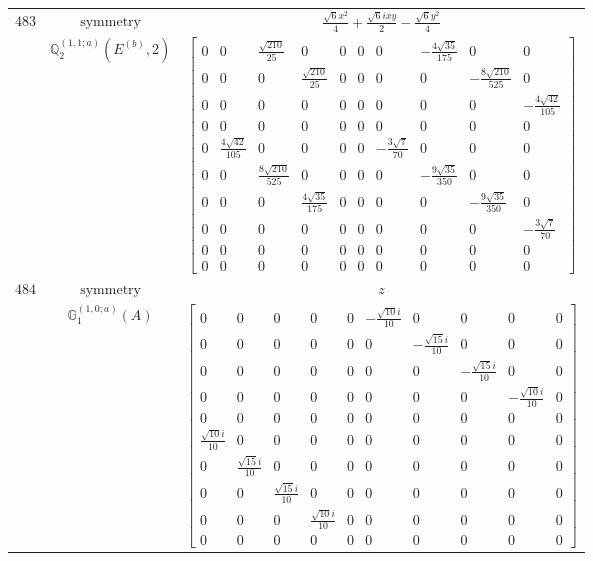 \documentclass[fleqn,8pt,landscape]{jsarticle}
\begin{document}
\begin{longtable}{ccc}
$ 483 $ & $ \text{symmetry} $ & $ \frac{\sqrt{6} x^{2}}{4} + \frac{\sqrt{6} i x y}{2} - \frac{\sqrt{6} y^{2}}{4} $ \\
$  $ & $ \mathbb{Q}_{2}^{(1,1;a)}(E^{(b)},2) $ & $ \begin{bmatrix} 0 & 0 & \frac{\sqrt{210}}{25} & 0 & 0 & 0 & 0 & - \frac{4 \sqrt{35}}{175} & 0 & 0 \\ 0 & 0 & 0 & \frac{\sqrt{210}}{25} & 0 & 0 & 0 & 0 & - \frac{8 \sqrt{210}}{525} & 0 \\ 0 & 0 & 0 & 0 & 0 & 0 & 0 & 0 & 0 & - \frac{4 \sqrt{42}}{105} \\ 0 & 0 & 0 & 0 & 0 & 0 & 0 & 0 & 0 & 0 \\ 0 & \frac{4 \sqrt{42}}{105} & 0 & 0 & 0 & 0 & - \frac{3 \sqrt{7}}{70} & 0 & 0 & 0 \\ 0 & 0 & \frac{8 \sqrt{210}}{525} & 0 & 0 & 0 & 0 & - \frac{9 \sqrt{35}}{350} & 0 & 0 \\ 0 & 0 & 0 & \frac{4 \sqrt{35}}{175} & 0 & 0 & 0 & 0 & - \frac{9 \sqrt{35}}{350} & 0 \\ 0 & 0 & 0 & 0 & 0 & 0 & 0 & 0 & 0 & - \frac{3 \sqrt{7}}{70} \\ 0 & 0 & 0 & 0 & 0 & 0 & 0 & 0 & 0 & 0 \\ 0 & 0 & 0 & 0 & 0 & 0 & 0 & 0 & 0 & 0 \end{bmatrix} $ \\ \hline
$ 484 $ & $ \text{symmetry} $ & $ z $ \\
$  $ & $ \mathbb{G}_{1}^{(1,0;a)}(A) $ & $ \begin{bmatrix} 0 & 0 & 0 & 0 & 0 & - \frac{\sqrt{10} i}{10} & 0 & 0 & 0 & 0 \\ 0 & 0 & 0 & 0 & 0 & 0 & - \frac{\sqrt{15} i}{10} & 0 & 0 & 0 \\ 0 & 0 & 0 & 0 & 0 & 0 & 0 & - \frac{\sqrt{15} i}{10} & 0 & 0 \\ 0 & 0 & 0 & 0 & 0 & 0 & 0 & 0 & - \frac{\sqrt{10} i}{10} & 0 \\ 0 & 0 & 0 & 0 & 0 & 0 & 0 & 0 & 0 & 0 \\ \frac{\sqrt{10} i}{10} & 0 & 0 & 0 & 0 & 0 & 0 & 0 & 0 & 0 \\ 0 & \frac{\sqrt{15} i}{10} & 0 & 0 & 0 & 0 & 0 & 0 & 0 & 0 \\ 0 & 0 & \frac{\sqrt{15} i}{10} & 0 & 0 & 0 & 0 & 0 & 0 & 0 \\ 0 & 0 & 0 & \frac{\sqrt{10} i}{10} & 0 & 0 & 0 & 0 & 0 & 0 \\ 0 & 0 & 0 & 0 & 0 & 0 & 0 & 0 & 0 & 0 \end{bmatrix} $ \\ \hline

\end{longtable}
\end{document}
